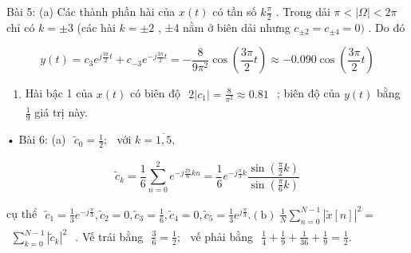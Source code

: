 \documentclass[
  10
]{article}
\providecommand{\tightlist}{%
  \setlength{\itemsep}{0pt}\setlength{\parskip}{0pt}}
\begin{document}
Bài 5: (a) Các thành phần hài của \(x ( t )\) có tần số
\(k \frac { \pi } { 2 }\) . Trong dải \(\pi < | \Omega | < 2 \pi\) chỉ
có \(k = \pm 3\) (các hài \(k = \pm 2\) , ±4 nằm ở biên dải nhưng
\(c _ { \pm 2 } = c _ { \pm 4 } = 0 )\) . Do đó

\[
y (t) = c _ {3} e ^ {j \frac {3 \pi}{2} t} + c _ {- 3} e ^ {- j \frac {3 \pi}{2} t} = - \frac {8}{9 \pi^ {2}} \cos \left(\frac {3 \pi}{2} t\right) \approx - 0. 0 9 0 \cos \left(\frac {3 \pi}{2} t\right)
\]

\begin{enumerate}
\def\labelenumi{(\alph{enumi})}
\setcounter{enumi}{1}
\tightlist
\item
  Hài bậc 1 của \(x ( t )\) có biên độ
  \(\begin{array} { r } { 2 | c _ { 1 } | = \frac { 8 } { \pi ^ { 2 } } \approx 0 . 8 1 } \end{array}\)
  ; biên độ của \(y ( t )\) bằng \(\textstyle { \frac { 1 } { 9 } }\)
  giá trị này.
\end{enumerate}

• Bài 6: (a)
\(\begin{array} { r } { \tilde { c } _ { 0 } = \frac { 1 } { 2 } ; } \end{array}\)
với \(k = \overline { { 1 , 5 } } ,\)

\[
\tilde {c} _ {k} = \frac {1}{6} \sum_ {n = 0} ^ {2} e ^ {- j \frac {2 \pi}{6} k n} = \frac {1}{6} e ^ {- j \frac {\pi}{3} k} \frac {\sin (\frac {\pi}{2} k)}{\sin (\frac {\pi}{6} k)}
\]

cụ thể
\(\begin{array} { r } { \tilde { c } _ { 1 } = \frac { 1 } { 3 } e ^ { - j \frac { \pi } { 3 } } , \tilde { c } _ { 2 } = 0 , \tilde { c } _ { 3 } = \frac { 1 } { 6 } , \tilde { c } _ { 4 } = 0 , \tilde { c } _ { 5 } = \frac { 1 } { 3 } e ^ { j \frac { \pi } { 3 } } . \mathrm { ( b ) } \ \frac { 1 } { N } \sum _ { n = 0 } ^ { N - 1 } | \tilde { x } [ n ] | ^ { 2 } = } \end{array}\)
\(\begin{array} { r } { \sum _ { k = 0 } ^ { N - 1 } | \tilde { c } _ { k } | ^ { 2 } } \end{array}\)
. Vế trái bằng
\(\begin{array} { r } { \frac { 3 } { 6 } = \frac { 1 } { 2 } ; } \end{array}\)
vế phải bằng
\(\begin{array} { r } { \frac { 1 } { 4 } + \frac { 1 } { 9 } + \frac { 1 } { 3 6 } + \frac { 1 } { 9 } = \frac { 1 } { 2 } . } \end{array}\)
\end{document}
